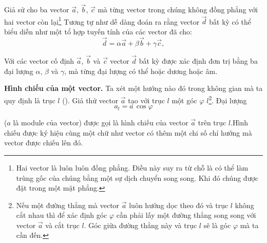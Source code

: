 Giả sử cho ba vector $\vec{a}$, $\vec{b}$, $\vec{c}$ mà từng vector trong chúng không đồng phẳng với hai vector còn lại\footnote{Hai vector là luôn luôn đồng phẳng. Điều này suy ra từ chỗ là có thể làm trùng gốc của chúng bằng một sự dịch chuyển song song. Khi đó chúng được đặt trong một mặt phẳng.} Tương tự như  dễ dàng đoán ra rằng vector $\vec{d}$ bất kỳ có thể biểu diễn như một tổ hợp tuyến tính của các vector đã cho:
\begin{equation}\label{eq:1_6}
\vec{d} = \alpha\vec{a} + \beta\vec{b} + \gamma\vec{c},
\end{equation}

\noindent
Với các vector cố định $\vec{a}$, $\vec{b}$ và $\vec{c}$ vector $\vec{d}$ bất kỳ được xác định đơn trị bằng ba đại lượng $\alpha$, $\beta$ và $\gamma$, mà từng đại lượng có thể hoặc dương hoặc âm.

\textbf{Hình chiếu của một vector.} Ta xét một hướng nào đó trong không gian mà ta quy định là trục $l$ (). Giả thử vector $\vec{a}$ tạo với trục $l$ một góc $\varphi$ $l$\footnote{Nếu một đường thẳng mà vector $\vec{a}$ luôn hướng dọc theo đó và trục $l$ không cắt nhau thì để xác định góc $\varphi$ cần phải lấy một đường thẳng song song với vector $\vec{a}$ và cắt trục $l$. Góc giữa đường thẳng này và trục $l$ sẽ là góc $\varphi$ mà ta cần đến.}. Đại lượng
\begin{equation}\label{eq:1_7}
a_l = a\, \cos\varphi
\end{equation}

\noindent
($a$ là module của vector) được gọi là hình chiếu của vector $\vec{a}$ trên trục $l$.Hình chiếu được ký hiệu cùng một chữ như vector có thêm một chi số chỉ hướng mà vector được chiếu lên đó.

